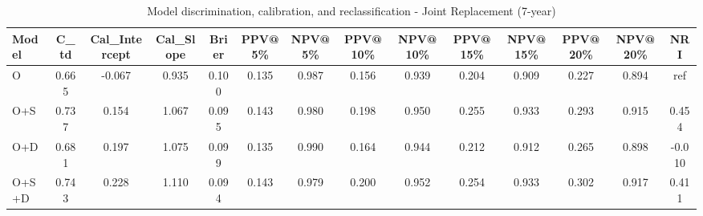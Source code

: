 \begin{table}[htbp]
\centering
\small
\caption{Model discrimination, calibration, and reclassification - Joint Replacement (7-year)}
\label{tab:perf_joint_7y}
\begin{tabular}{lccccccccccccc}
\toprule
Model & C\_td & Cal\_Intercept & Cal\_Slope & Brier & PPV@5\% & NPV@5\% & PPV@10\% & NPV@10\% & PPV@15\% & NPV@15\% & PPV@20\% & NPV@20\% & NRI \\
\midrule
O & 0.665 & -0.067 & 0.935 & 0.100 & 0.135 & 0.987 & 0.156 & 0.939 & 0.204 & 0.909 & 0.227 & 0.894 & ref \\
O+S & 0.737 & 0.154 & 1.067 & 0.095 & 0.143 & 0.980 & 0.198 & 0.950 & 0.255 & 0.933 & 0.293 & 0.915 & 0.454 \\
O+D & 0.681 & 0.197 & 1.075 & 0.099 & 0.135 & 0.990 & 0.164 & 0.944 & 0.212 & 0.912 & 0.265 & 0.898 & -0.010 \\
O+S+D & 0.743 & 0.228 & 1.110 & 0.094 & 0.143 & 0.979 & 0.200 & 0.952 & 0.254 & 0.933 & 0.302 & 0.917 & 0.411 \\
\bottomrule
\end{tabular}
\end{table}
